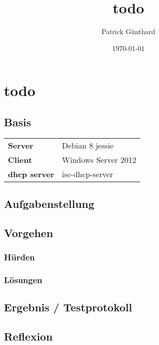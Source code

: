 \documentclass[11pt]{article}
\author{Patrick Günthard}
\date{\today}
\title{todo}
\begin{document}
\maketitle
\tableofcontents

\section{todo}
\label{sec-1}
\subsection{Basis}
\label{sec-1-1}

\begin{center}
\begin{tabular}{ll}
\textbf{Server} & Debian 8 jessie\\
\textbf{Client} & Windows Server 2012\\
\textbf{dhcp server} & isc-dhcp-server\\
\end{tabular}
\end{center}
\subsection{Aufgabenstellung}
\label{sec-1-2}
\subsection{Vorgehen}
\label{sec-1-3}
\subsubsection{Hürden}
\label{sec-1-3-1}
\subsubsection{Lösungen}
\label{sec-1-3-2}
\subsection{Ergebnis / Testprotokoll}
\label{sec-1-4}
\subsection{Reflexion}
\label{sec-1-5}
\end{document}
